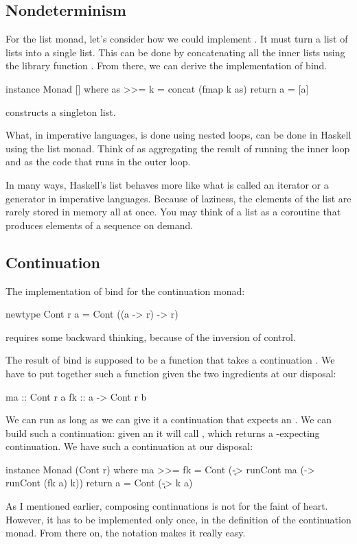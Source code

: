 \documentclass[DaoFP]{subfiles}
\begin{document}
\subsection{Nondeterminism}

For the list monad, let's consider how we could implement . It must turn a list of lists into a single list. This can be done by concatenating all the inner lists using the library function . From there, we can derive the implementation of bind.
\begin{haskell}
instance Monad [] where
  as >>= k = concat (fmap k as)
  return a = [a]
\end{haskell}
 constructs a singleton list.

What, in imperative languages, is done using nested loops, can be done in Haskell using the list monad. Think of  as aggregating the result of running the inner loop and  as the code that runs in the outer loop. 

In many ways, Haskell's list behaves more like what is called an iterator or a generator in imperative languages. Because of laziness, the elements of the list are rarely stored in memory all at once. You may think of a list as a coroutine that produces elements of a sequence on demand.

\subsection{Continuation}

The implementation of bind for the continuation monad:

\begin{haskell}
newtype Cont r a = Cont ((a -> r) -> r)
\end{haskell}
requires some backward thinking, because of the inversion of control. 

The result of bind is supposed to be a function that takes a continuation . We have to put together such a function given the two ingredients at our disposal: 
\begin{haskell}
ma :: Cont r a
fk :: a -> Cont r b
\end{haskell}
We can run  as long as we can give it a continuation that expects an . We can build such a continuation: given an  it will call , which returns a -expecting continuation. We have such a continuation  at our disposal:
\begin{haskell}
instance Monad (Cont r) where
  ma >>= fk = Cont (\k -> runCont ma (\a -> runCont (fk a) k))
  return a = Cont (\k -> k a)
\end{haskell}
As I mentioned earlier, composing continuations is not for the faint of heart. However, it has to be implemented only once, in the definition of the continuation monad. From there on, the  notation makes it really easy.
\end{document}
